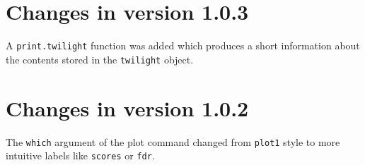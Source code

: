 \documentclass[11pt,a4paper,fleqn]{article}
\newcommand{\Robject}[1]{{\texttt{#1}}}
\newcommand{\Rfunction}[1]{{\texttt{#1}}}
\newcommand{\Rfunarg}[1]{{\texttt{#1}}}
\begin{document}
\section{Changes in version 1.0.3}

A \Rfunction{print.twilight} function was added which produces a short information about the contents stored in the \Robject{twilight} object.


\section{Changes in version 1.0.2}

The \Rfunarg{which} argument of the plot command changed from \Rfunction{plot1} style to more intuitive labels like \Rfunarg{scores} or \Rfunarg{fdr}.
\end{document}
